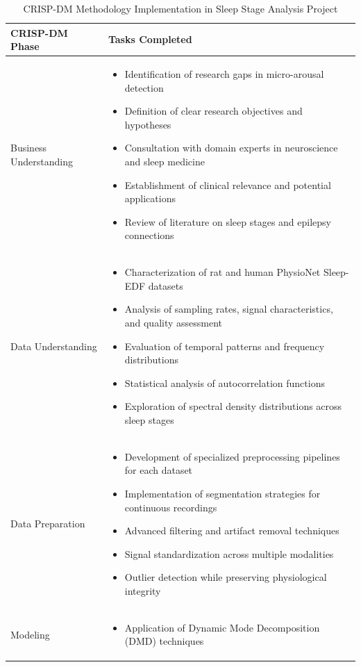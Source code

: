 \documentclass[a4paper,12pt,twoside]{article}
\begin{document}
\begin{table}[H]
\centering
\caption{CRISP-DM Methodology Implementation in Sleep Stage Analysis Project}
\begin{tabular}{|p{3cm}|p{11cm}|}
\hline
\textbf{CRISP-DM Phase} & \textbf{Tasks Completed} \\
\hline
Business Understanding & 
\begin{itemize}
  \item Identification of research gaps in micro-arousal detection
  \item Definition of clear research objectives and hypotheses
  \item Consultation with domain experts in neuroscience and sleep medicine
  \item Establishment of clinical relevance and potential applications
  \item Review of literature on sleep stages and epilepsy connections
\end{itemize} \\
\hline
Data Understanding & 
\begin{itemize}
  \item Characterization of rat and human PhysioNet Sleep-EDF datasets
  \item Analysis of sampling rates, signal characteristics, and quality assessment
  \item Evaluation of temporal patterns and frequency distributions
  \item Statistical analysis of autocorrelation functions
  \item Exploration of spectral density distributions across sleep stages
\end{itemize} \\
\hline
Data Preparation & 
\begin{itemize}
  \item Development of specialized preprocessing pipelines for each dataset
  \item Implementation of segmentation strategies for continuous recordings
  \item Advanced filtering and artifact removal techniques
  \item Signal standardization across multiple modalities
  \item Outlier detection while preserving physiological integrity
\end{itemize} \\
\hline
Modeling & 
\begin{itemize}
  \item Application of Dynamic Mode Decomposition (DMD) techniques

\end{itemize}
\end{tabular}
\end{table}
\end{document}
